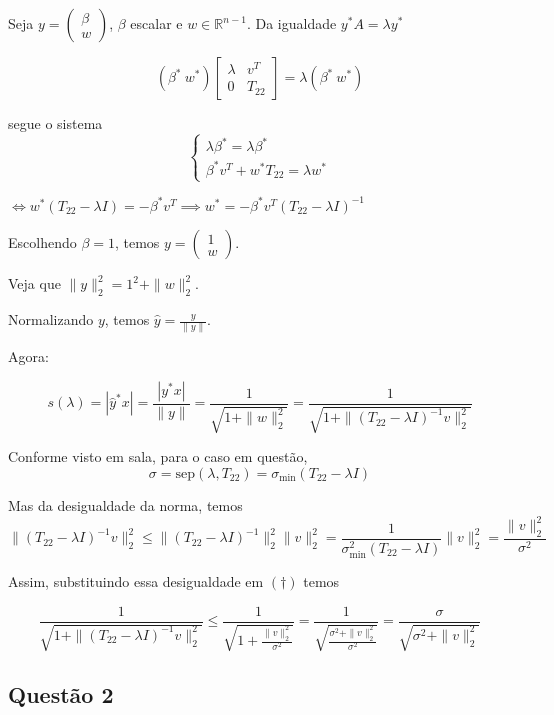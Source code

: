 \documentclass[11pt]{article}
\begin{document}
Seja \(y = \begin{pmatrix} \beta \\ w \end{pmatrix}\), \(\beta\) escalar
e \(w\in \mathbb{R}^{n-1}\). Da igualdade \(y^* A = \lambda y^*\)

\[(\beta^* \ w^*) \begin{bmatrix} \lambda & v^T \\ 0 & T_{22} \end{bmatrix} = \lambda (\beta^* \ w^*)\]

segue o sistema \[
\begin{cases}
\lambda \beta^* = \lambda \beta^* \\
\beta^* v^T + w^* T_{22} = \lambda w^*
\end{cases}
\]

\(\iff w^*(T_{22} - \lambda I) = -\beta^* v^T \implies w^* = -\beta^* v^T (T_{22} - \lambda I)^{-1}\)

Escolhendo \(\beta = 1\), temos
\(y = \begin{pmatrix} 1 \\ w \end{pmatrix}\).

Veja que \(\|y\|_2^2 = 1^2 + \|w\|_2^2\).

Normalizando \(y\), temos \(\hat{y} = \frac{y}{\|y\|}\).

Agora:

\[\tag{$\dagger$}
s(\lambda) = |\hat{y}^* x| = \frac{|y^* x|}{\|y\|} = \frac{1}{\sqrt{1 + \|w\|_2^2}} = \frac{1}{\sqrt{1 + \|(T_{22} - \lambda I)^{-1} v\|_2^2}}\]

    Conforme visto em sala, para o caso em questão,
\[ \sigma = \text{sep}(\lambda, T_{22}) = \sigma_{\min}(T_{22}-\lambda I)\]

Mas da desigualdade da norma, temos
\[ \|(T_{22} - \lambda I)^{-1} v\|_2^2 \le  \|(T_{22} - \lambda I)^{-1}\|_2^2\| v\|_2^2  = \frac1{\sigma^2_{\min}(T_{22}-\lambda I)}\|v\|_2^2 = \frac{\|v\|^2_2}{\sigma^2}\]

    Assim, substituindo essa desigualdade em \((\dagger)\) temos

\[\frac{1}{\sqrt{1 + \|(T_{22} - \lambda I)^{-1} v\|_2^2}} \le \frac{1}{\sqrt{1 + \frac{\|v\|^2_2}{\sigma^2}}} = \frac{1}{\sqrt{\frac{\sigma^2 + \|v\|^2_2}{\sigma^2}}} =  \frac{\sigma}{\sqrt{\sigma^2 + \|v\|^2_2}} \]

    \hypertarget{questuxe3o-2}{%
\subsection*{Questão 2}\label{questuxe3o-2}}
\end{document}
